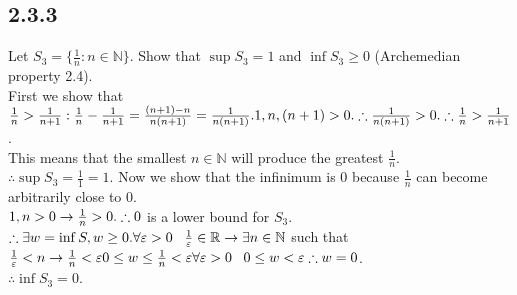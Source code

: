 \documentclass{article}
\begin{document}
\subsection{2.3.3}
Let $S_3 = \{\frac{1}{n}: n \in \mathbb{N}\}$. Show that $\sup{S_3} = 1$ and
$\inf{S_3} \ge 0$ (Archemedian property 2.4).
\\First we show that $\frac{1}{n} > \frac{1}{n+1}:
\\\frac{1}{n} - \frac{1}{n+1} = \frac{(n+1)-n}{n(n+1)} = \frac{1}{n(n+1)}.
\\1, n, (n+1) > 0.
\\\therefore \frac{1}{n(n+1)} > 0.
\\\therefore \frac{1}{n} > \frac{1}{n+1}$.
\\This means that the smallest $n \in \mathbb{N}$ will produce the greatest
$\frac{1}{n}$.
\\$\therefore \sup{S_3} = \frac{1}{1} = 1$.
\newpage
\noindent Now we show that the infinimum is 0 because $\frac{1}{n}$
can become arbitrarily close to 0.
\\$1,n > 0 \rightarrow \frac{1}{n} > 0.
\\\therefore 0$ is a lower bound for $S_3$.
\\$\therefore \exists w = \inf{S}, w \ge 0.
\\\forall \varepsilon > 0 \;\;\; \frac{1}{\varepsilon} \in \mathbb{R}
\rightarrow \exists n \in \mathbb{N}$ such that $\frac{1}{\varepsilon} < n
\rightarrow \frac{1}{n} < \varepsilon
\\0 \le w \le \frac{1}{n} < \varepsilon
\\\forall \varepsilon > 0 \;\;\; 0 \le w < \varepsilon
\\\therefore w = 0$.
\\$\therefore \inf{S_3} = 0$.
\end{document}
